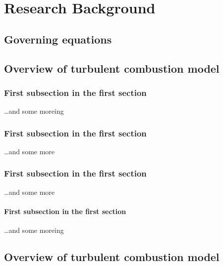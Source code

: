 
\chapter{Research Background}

\ifpdf
    \graphicspath{{Chapter2/Figs/Raster/}{Chapter2/Figs/PDF/}{Chapter2/Figs/}}
\else
    \graphicspath{{Chapter2/Figs/Vector/}{Chapter2/Figs/}}
\fi


\section[Governing equations]{Governing equations}
\section[Overview of turbulent combustion modelling]{Overview of turbulent combustion model}

\subsection{First subsection in the first section}
\dots and some moreing

\subsection{First subsection in the first section}
\dots and some more

\subsection{First subsection in the first section}
\dots and some more

\subsubsection{First subsection in the first section}
\dots and some moreing


\section[Overview of turbulent combustion modelling]{Overview of turbulent combustion model}

